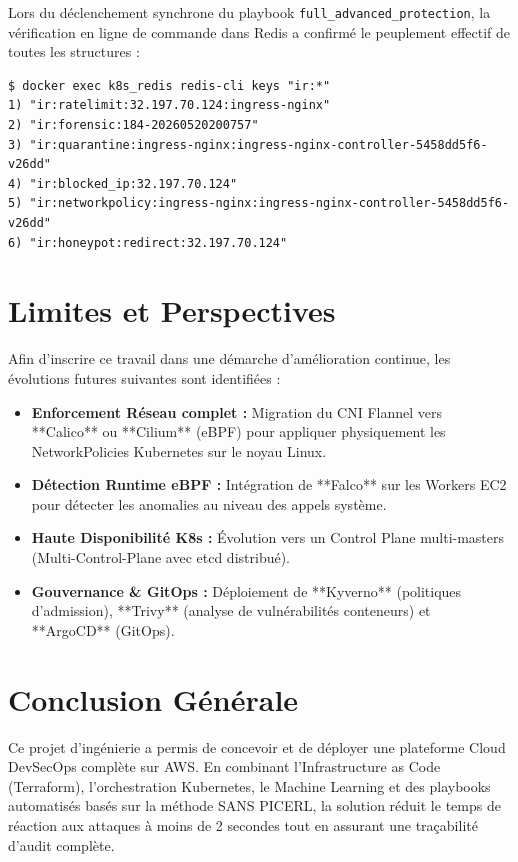 \documentclass[12pt,a4paper]{report}
\begin{document}
Lors du déclenchement synchrone du playbook \texttt{full\_advanced\_protection}, la vérification en ligne de commande dans Redis a confirmé le peuplement effectif de toutes les structures :

\begin{lstlisting}[caption={Sortie d'inspection CLI Redis attestant de l'exécution du Playbook}]
$ docker exec k8s_redis redis-cli keys "ir:*"
1) "ir:ratelimit:32.197.70.124:ingress-nginx"
2) "ir:forensic:184-20260520200757"
3) "ir:quarantine:ingress-nginx:ingress-nginx-controller-5458dd5f6-v26dd"
4) "ir:blocked_ip:32.197.70.124"
5) "ir:networkpolicy:ingress-nginx:ingress-nginx-controller-5458dd5f6-v26dd"
6) "ir:honeypot:redirect:32.197.70.124"
\end{lstlisting}

\chapter{Limites et Perspectives}
Afin d'inscrire ce travail dans une démarche d'amélioration continue, les évolutions futures suivantes sont identifiées :
\begin{itemize}
    \item \textbf{Enforcement Réseau complet :} Migration du CNI Flannel vers **Calico** ou **Cilium** (eBPF) pour appliquer physiquement les NetworkPolicies Kubernetes sur le noyau Linux.
    \item \textbf{Détection Runtime eBPF :} Intégration de **Falco** sur les Workers EC2 pour détecter les anomalies au niveau des appels système.
    \item \textbf{Haute Disponibilité K8s :} Évolution vers un Control Plane multi-masters (Multi-Control-Plane avec etcd distribué).
    \item \textbf{Gouvernance \& GitOps :} Déploiement de **Kyverno** (politiques d'admission), **Trivy** (analyse de vulnérabilités conteneurs) et **ArgoCD** (GitOps).
\end{itemize}

\chapter{Conclusion Générale}
Ce projet d'ingénierie a permis de concevoir et de déployer une plateforme Cloud DevSecOps complète sur AWS. En combinant l'Infrastructure as Code (Terraform), l'orchestration Kubernetes, le Machine Learning et des playbooks automatisés basés sur la méthode SANS PICERL, la solution réduit le temps de réaction aux attaques à moins de 2 secondes tout en assurant une traçabilité d'audit complète.
\end{document}
